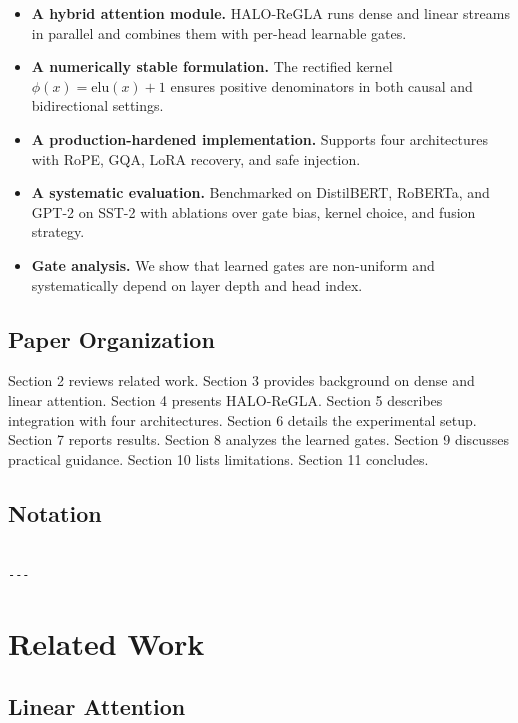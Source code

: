\begin{itemize}
\item \textbf{A hybrid attention module.} HALO-ReGLA runs dense and linear streams
  in parallel and combines them with per-head learnable gates.
\item \textbf{A numerically stable formulation.} The rectified kernel
  $\phi(x) = \mathrm{elu}(x) + 1$ ensures positive denominators in both
  causal and bidirectional settings.
\item \textbf{A production-hardened implementation.} Supports four architectures
  with RoPE, GQA, LoRA recovery, and safe injection.
\item \textbf{A systematic evaluation.} Benchmarked on DistilBERT, RoBERTa, and GPT-2
  on SST-2 with ablations over gate bias, kernel choice, and fusion strategy.
\item \textbf{Gate analysis.} We show that learned gates are non-uniform and
  systematically depend on layer depth and head index.

\end{itemize}
\subsection{Paper Organization}

Section 2 reviews related work. Section 3 provides background on dense and 
linear attention. Section 4 presents HALO-ReGLA. Section 5 describes 
integration with four architectures. Section 6 details the experimental 
setup. Section 7 reports results. Section 8 analyzes the learned gates. 
Section 9 discusses practical guidance. Section 10 lists limitations. 
Section 11 concludes.



\subsection{Notation}

\begin{lstlisting}

---
\end{lstlisting}


\section{Related Work}

\subsection{Linear Attention}

